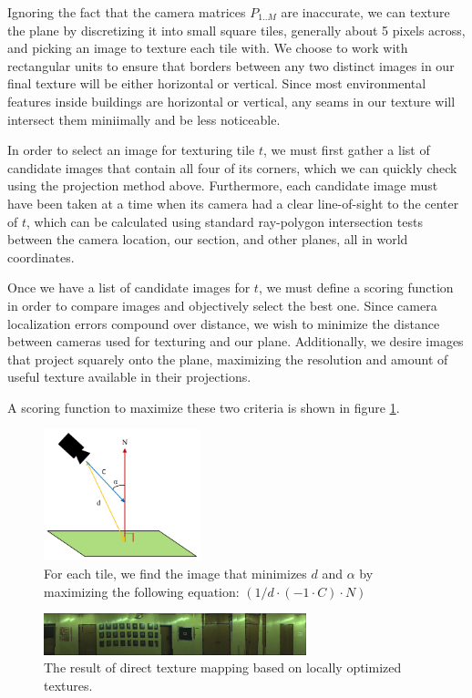 \documentclass[10pt,twocolumn,letterpaper]{article}
\begin{document}
Ignoring the fact that the camera matrices $P_{1..M}$ are inaccurate,
we can texture the plane by discretizing it into small square tiles,
generally about 5 pixels across, and picking an image to texture each
tile with. We choose to work with rectangular units to ensure that
borders between any two distinct images in our final texture will be
either horizontal or vertical. Since most environmental features
inside buildings are horizontal or vertical, any seams in our texture
will intersect them miniimally and be less noticeable.

In order to select an image for texturing tile $t$, we must first
gather a list of candidate images that contain all four of its
corners, which we can quickly check using the projection method
above. Furthermore, each candidate image must have been taken at a
time when its camera had a clear line-of-sight to the center of $t$,
which can be calculated using standard ray-polygon intersection tests
between the camera location, our section, and other planes, all in
world coordinates.

Once we have a list of candidate images for $t$, we must define a
scoring function in order to compare images and objectively select the
best one. Since camera localization errors compound over distance, we
wish to minimize the distance between cameras used for texturing and
our plane. Additionally, we desire images that project squarely onto
the plane, maximizing the resolution and amount of useful texture
available in their projections.

A scoring function to maximize these two criteria is shown in figure \ref{fig:scoringFunction}.

\begin{figure}
  \centering
  \includegraphics[height=1.5in]{scoringFunction.pdf}
  \caption{For each tile, we find the image that minimizes $d$ and $\alpha$ by maximizing the following equation: $(1/d \cdot (-1 \cdot C) \cdot N)$}
  \label{fig:scoringFunction}
\end{figure}



\begin{figure}
  \centering
  \includegraphics[width=3in]{wall1_naive.jpg}
  \caption{The result of direct texture mapping based on locally
    optimized textures.}
  \label{fig:directMapping}
\end{figure}
\end{document}
